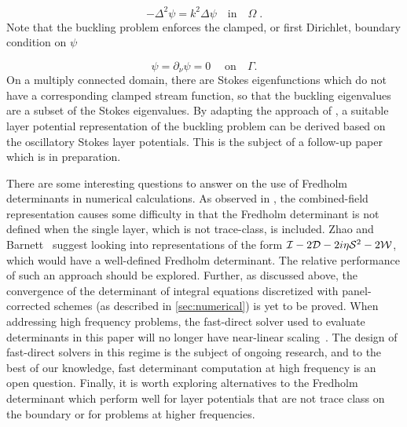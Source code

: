 \begin{equation*}
  -\Delta^2 \psi = k^2 \Delta \psi \quad \textrm{in} \quad \Omega\; .
\end{equation*}
Note that the buckling problem enforces the
clamped, or first Dirichlet, boundary
condition on $\psi$

\begin{equation*}
  \psi = \partial_\nu \psi = 0 \; \quad \textrm{on} \quad \Gamma.
\end{equation*}
On a multiply connected domain, there are
Stokes eigenfunctions which do not have a corresponding
clamped stream function, so that the
buckling eigenvalues are a subset of the Stokes
eigenvalues.
By adapting the approach of \cite{rachh2017integral},
a suitable layer potential representation of the
buckling problem can be derived based on the
oscillatory Stokes layer potentials.
%
This is the subject of a follow-up paper which is in
preparation.

There are some interesting questions to answer
on the use of Fredholm determinants in numerical
calculations.
%
As observed in \cite{zhao2015robust}, the
combined-field representation causes some
difficulty in that the Fredholm determinant
is not defined when the single layer, which
is not trace-class, is included.
%
Zhao and Barnett~\cite{zhao2015robust}
suggest looking into
representations of the form $\mathcal I-2{\mathcal D}
-2i\eta{\mathcal S}^2-2{\mathcal W}$,
which would have a well-defined Fredholm
determinant.
%
The relative performance of
such an approach should be explored.
%
Further, as discussed above, the
convergence of the determinant of
integral equations discretized with
panel-corrected schemes (as described in
\cref{sec:numerical}) is yet to be proved.
%
When addressing high frequency problems,
the fast-direct solver used to evaluate
determinants in this paper will no longer
have near-linear scaling~\cite{ho2012fast}.
%
The design of fast-direct solvers in this
regime is the subject of ongoing research, and
to the best of our knowledge, fast determinant
computation at high frequency is an open
question.
%
Finally, it is worth exploring alternatives
to the Fredholm determinant which perform well
for layer potentials that are not trace class
on the boundary or for problems at higher
frequencies.
